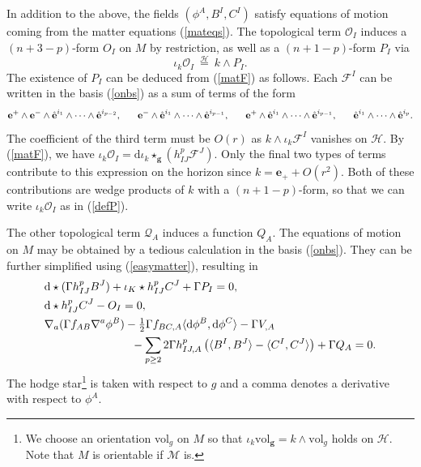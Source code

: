 \documentclass[11pt, reqno]{amsart}
\theoremstyle{plain}
\theoremstyle{definition}
\numberwithin{equation}{section}
\begin{document}
In addition to the above, the fields $(\phi^A,B^I,C^I)$ satisfy equations of motion coming from the matter equations (\ref{mateqs}). The topological term $\mathcal{O}_I$ induces a $(n+3-p)$-form $O_I$ on $M$ by restriction, as well as a $(n+1-p)$-form $P_I$ via
\begin{equation} \label{defP}
    \iota_k\mathcal{O}_I \:\overset{\mathcal{H}}{=}\:k\wedge P_I.
\end{equation}
The existence of $P_I$ can be deduced from (\ref{matF}) as follows. Each $\mathcal{F}^I$ can be written in the basis (\ref{onbs}) as a sum of terms of the form
\begin{align*}
    \textbf{e}^+ \wedge \textbf{e}^- \wedge \hat{\textbf{e}}^{i_1} \wedge \dots \wedge \hat{\textbf{e}}^{i_{p-2}} , \hspace{.6cm} \textbf{e}^- \wedge \hat{\textbf{e}}^{i_1} \wedge \dots \wedge \hat{\textbf{e}}^{i_{p-1}}, \hspace{.6cm} \textbf{e}^+ \wedge \hat{\textbf{e}}^{i_1} \wedge \dots \wedge \hat{\textbf{e}}^{i_{p-1}}, \hspace{.6cm}   \hat{\textbf{e}}^{i_1} \wedge \dots \wedge \hat{\textbf{e}}^{i_{p}}. 
\end{align*}
The coefficient of the third term must be $O(r)$ as  $k \wedge \iota_k \mathcal{F}^I$ vanishes on $\mathcal{H}$. By (\ref{matF}), we have $\iota_k \mathcal{O}_I = \text{d}\iota_k \star_{\textbf{g}} (h_{IJ}^p\mathcal{F}^J)$. Only the final two types of terms contribute to this expression on the horizon since $k =\textbf{e}_+ + O(r^2)$. Both of these contributions are wedge products of $k$ with a $(n+1-p)$-form, so that we can write $\iota_k\mathcal{O}_I$ as in (\ref{defP}).


The other topological term $\mathcal{Q}_A$ induces a function $Q_A$. The equations of motion on $M$ may be obtained by a tedious calculation in the basis (\ref{onbs}). They can be further simplified using (\ref{easymatter}), resulting in
\begin{subequations} \label{hormatF}
\begin{align}
    &\text{d}\star (\Gamma h^p_{IJ}B^J) + \iota_K \star h^p_{IJ}C^J + \Gamma P_I = 0, \label{mF1}\\
    &\text{d}\star h^p_{IJ}C^J - O_I = 0, \label{mF2} \\ 
    &\nabla_a(\Gamma f_{AB} \nabla^a \phi^B) - \tfrac 12\Gamma f_{BC,A}\langle \text{d}\phi^B,\text{d}\phi^C\rangle - \Gamma V_{,A} \nonumber \\ &\hspace{2.7cm} - \sum_{p\geq 2} 2\Gamma h^p_{IJ,A}\left(\langle B^I, B^J\rangle -\langle C^I, C^J \rangle\right) + \Gamma Q_A = 0.\label{phieom}
\end{align}
\end{subequations}
The hodge star\footnote{We choose an orientation vol$_g$ on $M$ so that $\iota_k\text{vol}_{\textbf{g}} = k \wedge \text{vol}_g$ holds on $\mathcal{H}$. Note that $M$ is orientable if $\mathcal{M}$ is.} is taken with respect to $g$ and a comma denotes a derivative with respect to $\phi^A$.
\end{document}
